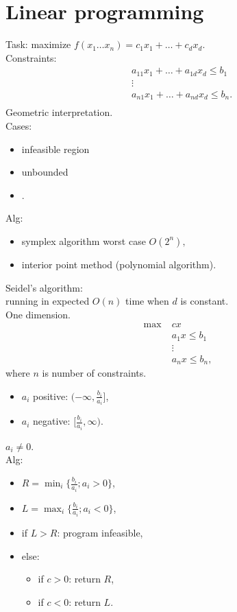\documentclass[a4paper, 12pt]{book}
\theoremstyle{definition}
\theoremstyle{remark}
\begin{document}
\section{Linear programming}

Task: maximize $f(x_1 \dots x_n) = c_1 x_1 + \dots + c_d x_d$. \\
Constraints:
\begin{align*}
  &a_{11} x_1 + \dots + a_{1d} x_d \leq b_1 \\
  &\vdots \\
  &a_{n1} x_1 + \dots + a_{nd} x_d \leq b_n. \\
\end{align*}
Geometric interpretation. \\
Cases:
\begin{itemize}
  \item infeasible region
  \item unbounded
  \item .
\end{itemize}
Alg:
\begin{itemize}
  \item symplex algorithm worst case $O\left(2^n\right),$
  \item interior point method (polynomial algorithm).
\end{itemize}
Seidel's algorithm: \\
running in expected $O(n)$ time when $d$ is constant. \\
One dimension.
\begin{align*}
  \max \; &c x \\
  &a_1 x \leq b_1 \\
  &\vdots \\
  &a_n x \leq b_n,
\end{align*}
where $n$ is number of constraints. \\
\begin{itemize}
  \item $a_i$ positive: $(-\infty, \frac{b_i}{a_i}]$,
  \item $a_i$ negative: $[\frac{b_i}{a_i}, \infty)$.
\end{itemize}
$a_i \neq 0$. \\
Alg:
\begin{itemize}[label={}]
  \item $R = \min_i \{\frac{b_i}{a_i}; a_i > 0\}$,
  \item $L = \max_i \{\frac{b_i}{a_i}; a_i < 0\}$,
  \item if $L > R$: program infeasible,
  \item else:
    \begin{itemize}[label={}]
      \item if $c > 0$: return $R$,
      \item if $c < 0$: return $L$.
    \end{itemize}
\end{itemize}
\end{document}
